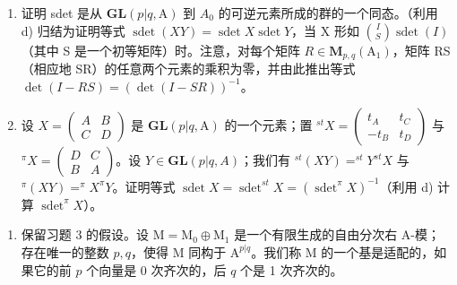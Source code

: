 \begin{enumerate}
\def\labelenumi{\alph{enumi})}
\setcounter{enumi}{4}
\tightlist
\item
  证明 sdet 是从 \(\mathbf{GL}(p|q,\mathrm{A})\) 到 \(A_{0}\) 的可逆元素所成的群的一个同态。（利用 d) 归结为证明等式 \(\operatorname{sdet}(XY)=\operatorname{sdet}X\operatorname{sdet}Y\)，当 X 形如 \(\binom{I}{S}\operatorname{sdet}(I)\)（其中 S 是一个初等矩阵）时。注意，对每个矩阵 \(R\in\mathbf{M}_{p,q}(\mathrm{A}_{1})\)，矩阵 RS（相应地 SR）的任意两个元素的乘积为零，并由此推出等式 \(\det(I-RS)=(\det(I-SR))^{-1}\)。
\item
  设 \(X = \begin{pmatrix} A & B \\ C & D \end{pmatrix}\) 是 \(\mathbf{GL}(p|q,\mathrm{A})\) 的一个元素；置 \(^{st}X = \begin{pmatrix} t_{A} & t_{C} \\ -t_{B} & t_{D} \end{pmatrix}\) 与 \(^{\pi}X = \begin{pmatrix} D & C \\ B & A \end{pmatrix}\)。设 \(Y \in \mathbf{GL}(p|q, A)\)；我们有 \(^{st}(XY) = ^{st}Y^{st}X\) 与 \(^{\pi}(XY) = ^{\pi}X^{\pi}Y\)。证明等式 \(\operatorname{sdet}X = \operatorname{sdet}^{st}X = (\operatorname{sdet}^{\pi}X)^{-1}\)（利用 d) 计算 \(\operatorname{sdet}^{\pi}X\)）。
\end{enumerate}

\begin{enumerate}
\def\labelenumi{\arabic{enumi})}
\setcounter{enumi}{3}
\tightlist
\item
  保留习题 3 的假设。设 \(\mathrm{M} = \mathrm{M}_0 \oplus \mathrm{M}_1\) 是一个有限生成的自由分次右 A-模；存在唯一的整数 \(p, q\)，使得 \(\mathrm{M}\) 同构于 \(\mathrm{A}^{p|q}\)。我们称 \(\mathrm{M}\) 的一个基是适配的，如果它的前 \(p\) 个向量是 0 次齐次的，后 \(q\) 个是 1 次齐次的。
\end{enumerate}

